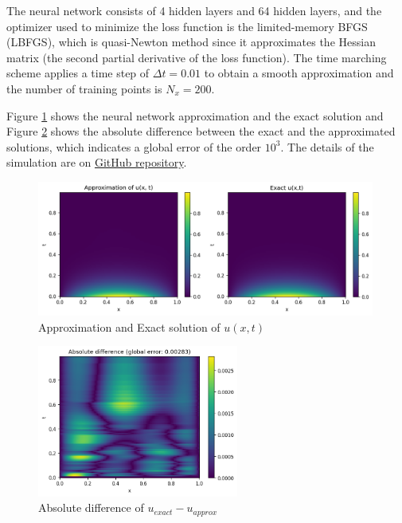 \documentclass[a4paper,12pt]{article}
\theoremstyle{definition}
\begin{document}
The neural network consists of 4 hidden layers and 64 hidden layers, and the optimizer used to
minimize the loss function is the limited-memory BFGS (LBFGS), which is quasi-Newton method since 
it approximates the Hessian matrix (the second partial derivative of the loss function). The time
marching scheme applies a time step of $\Delta t = 0.01$ to obtain a smooth approximation and the number
of training points is $N_x = 200$.

Figure \ref{exact_approximation_diffusion_RK} shows the neural network approximation and the exact solution 
and Figure \ref{abs_diff_disc_pinn_diffusion} shows the absolute difference between the exact and the approximated
solutions, which indicates a global error of the order $10^3$. The details of the simulation are on 
\href{https://github.com/HashimAlSadah/MX-Project/blob/main/PINN/discrete_time_model/Discrete_time_PINN_Diffusion_equation.ipynb}
{GitHub repository}.


\begin{figure}[H]
    \centering
    \includegraphics[width=420px]{images/diffusion_ex_app_dis_PINN.png}
    \vspace{-1em}
    \caption{Approximation and Exact solution of $u(x,t)$}
    \label{exact_approximation_diffusion_RK}
\end{figure}

\begin{figure}[H]
    \centering
    \includegraphics[width=250px]{images/abs_difference_disc_PINN_diffusion.png}
    \vspace{-1em}
    \caption{Absolute difference of $u_{exact} - u_{approx}$}
    \label{abs_diff_disc_pinn_diffusion}
\end{figure}
\end{document}
